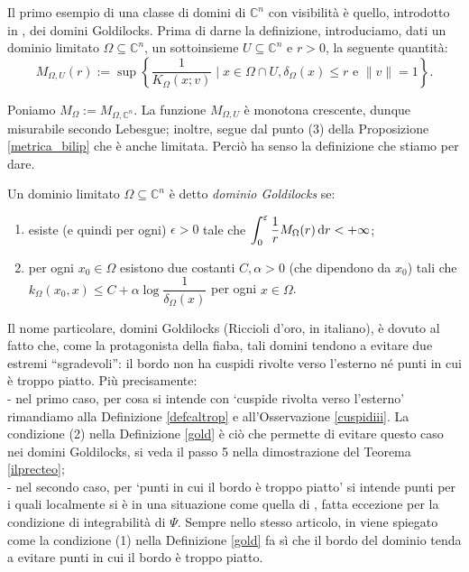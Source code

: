 Il primo esempio di una classe di domini di $\mathbb{C}^n$ con visibilità è quello, introdotto in \cite{BZ1}, dei domini Goldilocks. Prima di darne la definizione, introduciamo, dati un dominio limitato $\Omega\subseteq\mathbb{C}^n$, un sottoinsieme $U\subseteq\mathbb{C}^n$ e $r>0$, la seguente quantità:
$$M_{\Omega,U}(r):=\sup\left\{\frac{1}{K_\Omega(x;v)}\mid x\in\Omega\cap U,\delta_\Omega(x) \le r\text{ e } \|v\|=1\right\}.$$

Poniamo $M_\Omega:=M_{\Omega,\mathbb{C}^n}$. La funzione $M_{\Omega,U}$ è monotona crescente, dunque misurabile secondo Lebesgue; inoltre, segue dal punto (3) della Proposizione \ref{metrica_bilip} che è anche limitata. Perciò ha senso la definizione che stiamo per dare.

\begin{defn} \label{gold}
    Un dominio limitato $\Omega\subseteq\mathbb{C}^n$ è detto \textit{dominio Goldilocks} se:
    \begin{enumerate}[label={(\arabic*)}]
        \item esiste (e quindi per ogni) $\epsilon>0$ tale che $\displaystyle\int_0^{\varepsilon} \frac{1}{r}M_\Omega(r)\mathop{}\!\mathrm{d} r<+\infty$;
        \item per ogni $x_0\in\Omega$ esistono due costanti $C,\alpha>0$ (che dipendono da $x_0$) tali che $k_\Omega(x_0,x) \le C+\alpha\log{\dfrac{1}{\delta_\Omega(x)}}$ per ogni $x\in\Omega$.
    \end{enumerate}
\end{defn}

\begin{oss}
    Il nome particolare, domini Goldilocks (Riccioli d'oro, in italiano), è dovuto al fatto che, come la protagonista della fiaba, tali domini tendono a evitare due estremi ``sgradevoli'': il bordo non ha cuspidi rivolte verso l'esterno né punti in cui è troppo piatto. Più precisamente:\\
    - nel primo caso, per cosa si intende con `cuspide rivolta verso l'esterno' rimandiamo alla Definizione \ref{defcaltrop} e all'Osservazione \ref{cuspidiii}. La condizione (2) nella Definizione \ref{gold} è ciò che permette di evitare questo caso nei domini Goldilocks, si veda il passo 5 nella dimostrazione del Teorema \ref{ilprecteo};\\
    - nel secondo caso, per `punti in cui il bordo è troppo piatto' si intende punti per i quali localmente si è in una situazione come quella di \cite[Definition 2.7 and Lemma 2.9]{BZ1}, fatta eccezione per la condizione di integrabilità di $\Psi$. Sempre nello stesso articolo, in \cite[Remark 2.10]{BZ1} viene spiegato come la condizione (1) nella Definizione \ref{gold} fa sì che il bordo del dominio tenda a evitare punti in cui il bordo è troppo piatto.
\end{oss}

